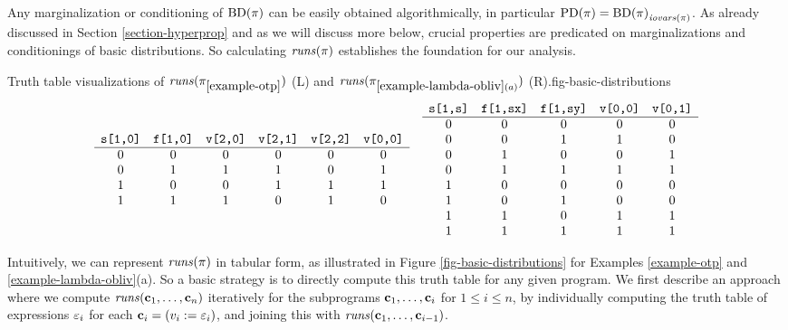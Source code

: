 Any marginalization or conditioning of $\mathrm{BD}(\pi)$ can be easily
obtained algorithmically, in particular $\mathrm{PD}(\pi) =
{\mathrm{BD}(\pi)}_{\mathit{iovars}(\pi)}$.  As already discussed in Section
\ref{section-hyperprop} and as we will discuss more below,
crucial properties are predicated on marginalizations
and conditionings of basic distributions. So calculating
$\mathit{runs}(\pi)$ establishes the foundation for our analysis.

\begin{fpfig}[t]{Truth table visualizations of $\mathit{runs}(\pi_{\ref{example-otp}})$ (L) and
    $\mathit{runs}(\pi_{\ref{example-lambda-obliv}(a)})$ (R).}{fig-basic-distributions}
{\footnotesize
  $$
  \begin{array}{cc}
    \begin{array}{cccccc}
      \verb+s[1,0]+ & \verb+f[1,0]+ & \verb+v[2,0]+  & \verb+v[2,1]+ & \verb+v[2,2]+ & \verb+v[0,0]+\\
      \hline
      0 & 0 & 0 & 0 & 0 & 0 \\ 
      0 & 1 & 1 & 1 & 0 & 1 \\ 
      1 & 0 & 0 & 1 & 1 & 1 \\ 
      1 & 1 & 1 & 0 & 1 & 0
    \end{array}
    & 
    \begin{array}{ccccc}
      \verb+s[1,s]+ & \verb+f[1,sx]+ & \verb+f[1,sy]+ & \verb+v[0,0]+ & \verb+v[0,1]+ \\
      \hline
      0 & 0 & 0 & 0 & 0 \\ 
      0 & 0 & 1 & 1 & 0 \\ 
      0 & 1 & 0 & 0 & 1 \\ 
      0 & 1 & 1 & 1 & 1 \\
      1 & 0 & 0 & 0 & 0 \\ 
      1 & 0 & 1 & 0 & 0 \\ 
      1 & 1 & 0 & 1 & 1 \\ 
      1 & 1 & 1 & 1 & 1  
    \end{array}
  \end{array}
  $$
}
\end{fpfig}

Intuitively, we can represent $\mathit{runs}(\pi)$ in tabular form, as
illustrated in Figure \ref{fig-basic-distributions} for Examples
\ref{example-otp} and \ref{example-lambda-obliv}(a). So a basic
strategy is to directly compute this truth table for any given
program. We first describe an approach where we compute
$\mathit{runs}(\mathbf{c}_1,\ldots,\mathbf{c}_n)$ iteratively for the subprograms
$\mathbf{c}_1,\ldots,\mathbf{c}_i$ for $1 \le i \le n$, by individually
computing the truth table of expressions $\varepsilon_i$ for each $\mathbf{c}_i =
(v_i := \varepsilon_i)$, and joining this with
$\mathit{runs}(\mathbf{c}_1,\ldots,\mathbf{c}_{i-1})$.

